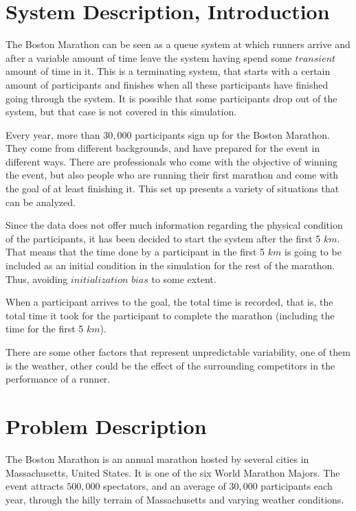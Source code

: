 \documentclass[11pt, oneside]{article}   	%
\begin{document}
\section{System Description, Introduction}

The Boston Marathon can be seen as a queue system at which runners arrive and after a variable amount of time leave the system having spend some $transient$ amount of time in it. This is a terminating system, that starts with a certain amount of participants and finishes when all these participants have finished going through the system. It is possible that some participants drop out of the system, but that case is not covered in this simulation.

Every year, more than $30,000$ participants sign up for the Boston Marathon. They come from different backgrounds, and have prepared for the event in different ways. There are professionals who come with the objective of winning the event, but also people who are running their first marathon and come with the goal of at least finishing it. This set up presents a variety of situations that can be analyzed.

Since the data does not offer much information regarding the physical condition of the participants, it has been decided to start the system after the first 5 $km$. That means that the time done by a participant in the first 5 $km$ is going to be included as an initial condition in the simulation for the rest of the marathon. Thus, avoiding $\textit{initialization bias}$ to some extent.

When a participant arrives to the goal, the total time is recorded, that is, the total time it took for the participant to complete the marathon (including the time for the first 5 $km$). 

There are some other factors that represent unpredictable variability, one of them is the weather, other could be the effect of the surrounding competitors in the performance of a runner. 

\section{Problem Description}

The Boston Marathon is an annual marathon hosted by several cities in Massachusetts, United States. It is one of the six World Marathon Majors. The event attracts $500,000$ spectators, and an average of $30,000$ participants each year, through the hilly terrain of Massachusetts and varying weather conditions. 
\end{document}
